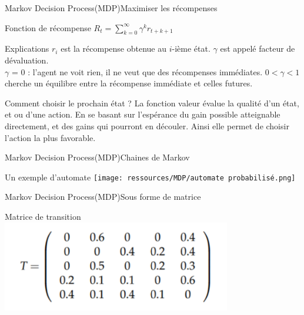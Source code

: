 \begin{frame}{Markov Decision Process(MDP)}{Maximiser les récompenses}
	\begin{center}
		
		\begin{block}{Fonction de récompense}
            \centering
			$R_t = \sum^{\infty}_{k=0}\gamma^{k}r_{t+k+1}$
		\end{block}
		\begin{block}{Explications}
			$r_{i}$ est la récompense obtenue au $i$-ième état.
			$\gamma$ est appelé facteur de dévaluation.\\
			$\gamma$ = 0 : l'agent ne voit rien, il ne veut que des récompenses immédiates.
			$0< \gamma <1$ cherche un équilibre entre la récompense immédiate et celles futures.
		\end{block}
		\begin{block}{Comment choisir le prochain état ?}
			La fonction valeur évalue la qualité d’un état, et ou d’une action. En se basant sur l’espérance du gain possible atteignable directement, et des gains qui pourront en découler. Ainsi elle permet de choisir l’action la plus favorable.
		\end{block}
	\end{center}
\end{frame}
\begin{frame}{Markov Decision Process(MDP)}{Chaines de Markov}
	\begin{center}
		
		\begin{center}{Un exemple d'automate}
			\texttt{[image: ressources/MDP/automate probabilisé.png]}
		\end{center}
	\end{center}
\end{frame}
\begin{frame}{Markov Decision Process(MDP)}{Sous forme de matrice}
	\begin{center}
		\begin{center}{Matrice de transition}
			\includegraphics[width=10cm]{ressources/MDP/Matrice de transitions.png}
		\end{center}
	\end{center}
\end{frame}
